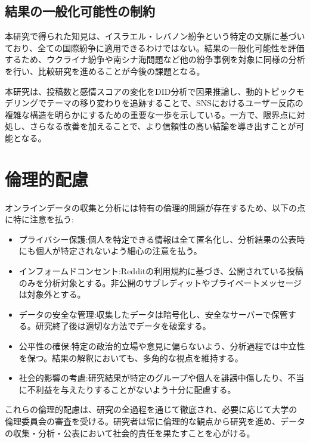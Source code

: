 \documentclass[11pt, a4j]{jreport}
\begin{document}
    \subsection{結果の一般化可能性の制約}
    本研究で得られた知見は、イスラエル・レバノン紛争という特定の文脈に基づいており、全ての国際紛争に適用できるわけではない。結果の一般化可能性を評価するため、ウクライナ紛争や南シナ海問題など他の紛争事例を対象に同様の分析を行い、比較研究を進めることが今後の課題となる。

    本研究は、投稿数と感情スコアの変化をDID分析で因果推論し、動的トピックモデリングでテーマの移り変わりを追跡することで、SNSにおけるユーザー反応の複雑な構造を明らかにするための重要な一歩を示している。一方で、限界点に対処し、さらなる改善を加えることで、より信頼性の高い結論を導き出すことが可能となる。

    \section{倫理的配慮}
    オンラインデータの収集と分析には特有の倫理的問題が存在するため、以下の点に特に注意を払う:

    \begin{itemize}
        \item プライバシー保護:個人を特定できる情報は全て匿名化し、分析結果の公表時にも個人が特定されないよう細心の注意を払う。

        \item インフォームドコンセント:Redditの利用規約に基づき、公開されている投稿のみを分析対象とする。非公開のサブレディットやプライベートメッセージは対象外とする。

        \item データの安全な管理:収集したデータは暗号化し、安全なサーバーで保管する。研究終了後は適切な方法でデータを破棄する。

        \item 公平性の確保:特定の政治的立場や意見に偏らないよう、分析過程では中立性を保つ。結果の解釈においても、多角的な視点を維持する。

        \item 社会的影響の考慮:研究結果が特定のグループや個人を誹謗中傷したり、不当に不利益を与えたりすることがないよう十分に配慮する。
    \end{itemize}

    これらの倫理的配慮は、研究の全過程を通じて徹底され、必要に応じて大学の倫理委員会の審査を受ける。研究者は常に倫理的な観点から研究を進め、データの収集・分析・公表において社会的責任を果たすことを心がける。
\end{document}

